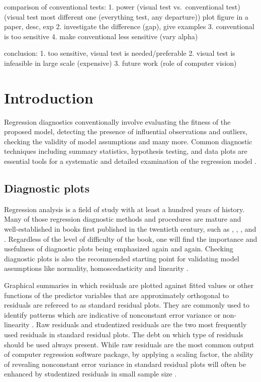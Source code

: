 \documentclass[]{interact}
\theoremstyle{plain}%
\theoremstyle{definition}
\theoremstyle{remark}
\begin{document}
comparison of conventional tests: 1. power (visual test vs.~conventional
test) (visual test most different one (everything test, any departure))
plot figure in a paper, desc, exp 2. investigate the difference (gap),
give examples 3. conventional is too sensitive 4. make conventional less
sensitive (vary alpha)

conclusion: 1. too sensitive, visual test is needed/preferable 2. visual
test is infeasible in large scale (expensive) 3. future work (role of
computer vision)

\hypertarget{introduction}{%
\section{Introduction}\label{introduction}}

Regression diagnostics conventionally involve evaluating the fitness of
the proposed model, detecting the presence of influential observations
and outliers, checking the validity of model assumptions and many more.
Common diagnostic techniques including summary statistics, hypothesis
testing, and data plots are essential tools for a systematic and
detailed examination of the regression model
\citep{mansfield1987diagnostic}.

\hypertarget{diagnostic-plots}{%
\subsection{Diagnostic plots}\label{diagnostic-plots}}

Regression analysis is a field of study with at least a hundred years of
history. Many of those regression diagnostic methods and procedures are
mature and well-established in books first published in the twentieth
century, such as \citet{draper_applied_2014},
\citet{montgomery_introduction_2012}, \citet{belsley_regression_1980},
\citet{cook_applied_1999} and \citet{cook1982residuals}. Regardless of
the level of difficulty of the book, one will find the importance and
usefulness of diagnostic plots being emphasized again and again.
Checking diagnostic plots is also the recommended starting point for
validating model assumptions like normality, homoscedasticity and
linearity \citep{anscombe_examination_1963}.

Graphical summaries in which residuals are plotted against fitted values
or other functions of the predictor variables that are approximately
orthogonal to residuals are refereed to as standard residual plots. They
are commonly used to identify patterns which are indicative of
nonconstant error variance or non-linearity \citep{cook1982residuals}.
Raw residuals and studentized residuals are the two most frequently used
residuals in standard residual plots. The debt on which type of
residuals should be used always present. While raw residuals are the
most common output of computer regression software package, by applying
a scaling factor, the ability of revealing nonconstant error variance in
standard residual plots will often be enhanced by studentized residuals
in small sample size \citep{gunst2018regression}.
\end{document}
